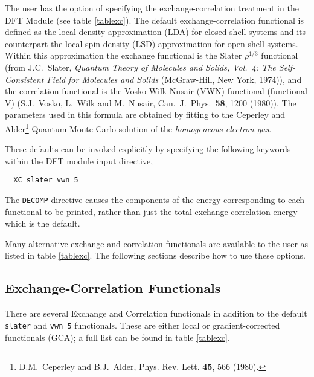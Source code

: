 The user has the option of specifying the exchange-correlation
treatment in the DFT Module (see table \ref{tablexc}).
  The default exchange-correlation
functional is defined as the local density approximation (LDA) for
closed shell systems and its counterpart the local spin-density (LSD)
approximation for open shell systems.  Within this approximation the
exchange functional is the Slater $\rho^{1/3}$ functional (from
J.C.~Slater, {\sl Quantum Theory of Molecules and Solids, Vol.~4: The
  Self-Consistent Field for Molecules and Solids} (McGraw-Hill, New
York, 1974)), and the correlation functional is the Vosko-Wilk-Nusair
(VWN) functional (functional V) (S.J.~Vosko, L.~Wilk and M.~Nusair,
Can.~J.~Phys.~{\bf 58}, 1200 (1980)).  The parameters used in this
formula are obtained by fitting to the Ceperley and
Alder\footnote{D.M.~Ceperley and B.J.~Alder, Phys. Rev. Lett. {\bf
    45}, 566 (1980).}
Quantum Monte-Carlo solution of the {\em
  homogeneous electron gas}.

These defaults can be invoked explicitly by specifying the following
keywords within the DFT module input directive,
\begin{verbatim}
  XC slater vwn_5
\end{verbatim}

The \verb+DECOMP+ directive causes the components of the energy
corresponding to each functional to be printed, rather than just the
total exchange-correlation energy which is the default.

Many alternative exchange and correlation functionals are available to
the user as listed in table \ref{tablexc}.  The following sections describe 
how to use these options.

\subsection{Exchange-Correlation Functionals}

There are several Exchange and Correlation functionals in addition to the 
default {\tt slater} and {\tt vwn\_5}
functionals.  These are either local or gradient-corrected functionals (GCA);
a full list can be found in table \ref{tablexc}. 

